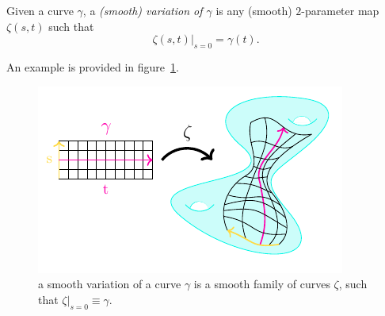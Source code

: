 \begin{definition}
	Given a curve \(\gamma\), a \emph{(smooth) variation of \(\gamma\)} is any (smooth) \(2\)-parameter map \(\zeta(s,t)\) such that 
	\[
	\left. \zeta(s, t) \right\vert_{s = 0} = \gamma(t).
	\]
\end{definition}
An example is provided in figure~\ref{fig:family-curves}.
\begin{figure}
	\caption[]{a smooth variation of a curve \(\gamma\) is a smooth family of curves \(\zeta\), such that \(\zeta\vert_{s = 0} \equiv \gamma\).}
	\label{fig:family-curves}
	\centering
	\includegraphics[scale=2.2]{Immagini/family-geodesics/family-geodesics.pdf}
\end{figure}

